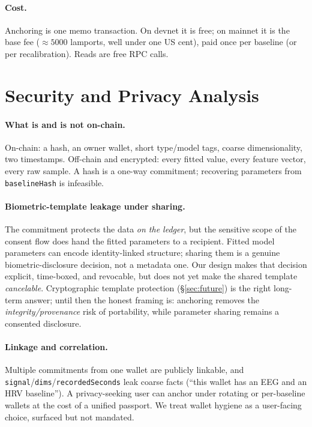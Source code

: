 \documentclass[10pt,twocolumn]{article}
\newcommand{\code}[1]{\texttt{\small #1}}
\begin{document}
\paragraph{Cost.} Anchoring is one memo transaction. On devnet it is free; on
mainnet it is the base fee ($\approx\!5000$ lamports, well under one US cent),
paid once per baseline (or per recalibration). Reads are free RPC calls.

\section{Security and Privacy Analysis}

\paragraph{What is and is not on-chain.} On-chain: a hash, an owner wallet, short
type/model tags, coarse dimensionality, two timestamps. Off-chain and encrypted:
every fitted value, every feature vector, every raw sample. A hash is a one-way
commitment; recovering parameters from \code{baselineHash} is infeasible.

\paragraph{Biometric-template leakage under sharing.} The commitment protects the
data \emph{on the ledger}, but the sensitive scope of the consent flow does hand
the fitted parameters to a recipient. Fitted model parameters can encode
identity-linked structure; sharing them is a genuine biometric-disclosure
decision, not a metadata one. Our design makes that decision explicit,
time-boxed, and revocable, but does not yet make the shared template
\emph{cancelable}. Cryptographic template protection (\S\ref{sec:future}) is the
right long-term answer; until then the honest framing is: anchoring removes the
\emph{integrity/provenance} risk of portability, while parameter sharing remains
a consented disclosure.

\paragraph{Linkage and correlation.} Multiple commitments from one wallet are
publicly linkable, and \code{signal}/\code{dims}/\code{recordedSeconds} leak
coarse facts (``this wallet has an EEG and an HRV baseline''). A privacy-seeking
user can anchor under rotating or per-baseline wallets at the cost of a unified
passport. We treat wallet hygiene as a user-facing choice, surfaced but not
mandated.
\end{document}
